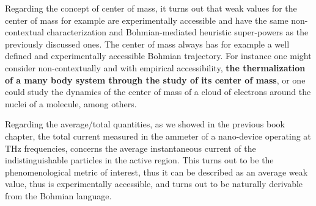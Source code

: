 \documentclass[11pt, a4paper]{article} %
\begin{document}
Regarding the concept of center of mass, it turns out that weak values for the center of mass for example are experimentally accessible and have the same non-contextual characterization and Bohmian-mediated heuristic super-powers as the previously discussed ones. The center of mass always has for example a well defined and experimentally accessible Bohmian trajectory. For instance one might consider non-contextually and with empirical accessibility, {\bf the thermalization of a many body system through the study of its center of mass}, or one could study the dynamics of the center of mass of a cloud of electrons around the nuclei of a molecule, among others.

Regarding the average/total quantities, as we showed in the previous book chapter, the total current measured in the ammeter of a nano-device operating at THz frequencies, concerns the average instantaneous current of the indistinguishable particles in the active region. This turns out to be the phenomenological metric of interest, thus it can be described as an average weak value, thus is experimentally accessible, and turns out to be naturally derivable from the Bohmian language.
\end{document}
